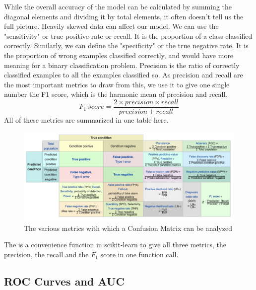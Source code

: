 \documentclass{article}
\newcommand{\code}[1]{{\fontfamily{zi4} \selectfont{#1}}}
\begin{document}
While the overall accuracy of the model can be calculated by summing the diagonal elements and dividing it by total elements, it often doesn't tell us the full picture. Heavily skewed data can affect our model. We can use the "sensitivity" or true positive rate or recall. It is the proportion of a class classified correctly. Similarly, we can define the "specificity" or the true negative rate. It is the proportion of wrong examples classified correctly, and would have more meaning for a binary classification problem. Precision is the ratio of correctly classified examples to all the examples classified so. As precision and recall are the most important metrics to draw from this, we use it to give one single number the F1 score, which is the harmonic mean of precision and recall.
$$F_1 \ score = \frac{2 \times precision \times recall}{precision + recall}$$
All of these metrics are summarized in one table here.

\begin{figure}[H]
\includegraphics[width=\linewidth]{Images/confmatmetrics.jpeg}
\centering
\caption{The various metrics with which a Confusion Matrix can be analyzed}
\end{figure}

The \code{classification\_report} is a convenience function in scikit-learn to give all three metrics, the precision, the recall and the $F_1$ score in one function call.

\subsection{ROC Curves and AUC}
\end{document}
